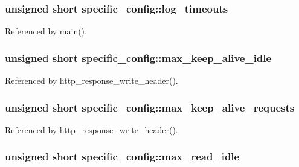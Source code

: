 \hypertarget{structspecific__config_acb265bc71b3368a4b79d03282156c848}{
\subsubsection[{log\-\_\-timeouts}]{\setlength{\rightskip}{0pt plus 5cm}unsigned short specific\-\_\-config\-::log\-\_\-timeouts}}\label{structspecific__config_acb265bc71b3368a4b79d03282156c848}


Referenced by main().

\hypertarget{structspecific__config_a0648ebac1a3dab4d171b15692bbe7394}{
\subsubsection[{max\-\_\-keep\-\_\-alive\-\_\-idle}]{\setlength{\rightskip}{0pt plus 5cm}unsigned short specific\-\_\-config\-::max\-\_\-keep\-\_\-alive\-\_\-idle}}\label{structspecific__config_a0648ebac1a3dab4d171b15692bbe7394}


Referenced by http\-\_\-response\-\_\-write\-\_\-header().

\hypertarget{structspecific__config_a5561ac45357a155b2fc4480dc664398f}{
\subsubsection[{max\-\_\-keep\-\_\-alive\-\_\-requests}]{\setlength{\rightskip}{0pt plus 5cm}unsigned short specific\-\_\-config\-::max\-\_\-keep\-\_\-alive\-\_\-requests}}\label{structspecific__config_a5561ac45357a155b2fc4480dc664398f}


Referenced by http\-\_\-response\-\_\-write\-\_\-header().

\hypertarget{structspecific__config_abae0f7b481f85bfe82a377b0950b70ca}{
\subsubsection[{max\-\_\-read\-\_\-idle}]{\setlength{\rightskip}{0pt plus 5cm}unsigned short specific\-\_\-config\-::max\-\_\-read\-\_\-idle}}\label{structspecific__config_abae0f7b481f85bfe82a377b0950b70ca}


